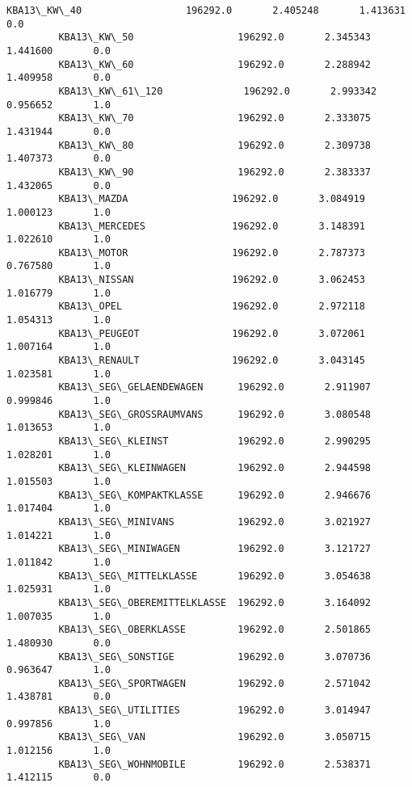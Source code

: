 \documentclass[11pt]{article}
\begin{document}
\begin{Verbatim}[commandchars=\\\{\}]
         KBA13\_KW\_40                  196292.0       2.405248       1.413631       0.0   
         KBA13\_KW\_50                  196292.0       2.345343       1.441600       0.0   
         KBA13\_KW\_60                  196292.0       2.288942       1.409958       0.0   
         KBA13\_KW\_61\_120              196292.0       2.993342       0.956652       1.0   
         KBA13\_KW\_70                  196292.0       2.333075       1.431944       0.0   
         KBA13\_KW\_80                  196292.0       2.309738       1.407373       0.0   
         KBA13\_KW\_90                  196292.0       2.383337       1.432065       0.0   
         KBA13\_MAZDA                  196292.0       3.084919       1.000123       1.0   
         KBA13\_MERCEDES               196292.0       3.148391       1.022610       1.0   
         KBA13\_MOTOR                  196292.0       2.787373       0.767580       1.0   
         KBA13\_NISSAN                 196292.0       3.062453       1.016779       1.0   
         KBA13\_OPEL                   196292.0       2.972118       1.054313       1.0   
         KBA13\_PEUGEOT                196292.0       3.072061       1.007164       1.0   
         KBA13\_RENAULT                196292.0       3.043145       1.023581       1.0   
         KBA13\_SEG\_GELAENDEWAGEN      196292.0       2.911907       0.999846       1.0   
         KBA13\_SEG\_GROSSRAUMVANS      196292.0       3.080548       1.013653       1.0   
         KBA13\_SEG\_KLEINST            196292.0       2.990295       1.028201       1.0   
         KBA13\_SEG\_KLEINWAGEN         196292.0       2.944598       1.015503       1.0   
         KBA13\_SEG\_KOMPAKTKLASSE      196292.0       2.946676       1.017404       1.0   
         KBA13\_SEG\_MINIVANS           196292.0       3.021927       1.014221       1.0   
         KBA13\_SEG\_MINIWAGEN          196292.0       3.121727       1.011842       1.0   
         KBA13\_SEG\_MITTELKLASSE       196292.0       3.054638       1.025931       1.0   
         KBA13\_SEG\_OBEREMITTELKLASSE  196292.0       3.164092       1.007035       1.0   
         KBA13\_SEG\_OBERKLASSE         196292.0       2.501865       1.480930       0.0   
         KBA13\_SEG\_SONSTIGE           196292.0       3.070736       0.963647       1.0   
         KBA13\_SEG\_SPORTWAGEN         196292.0       2.571042       1.438781       0.0   
         KBA13\_SEG\_UTILITIES          196292.0       3.014947       0.997856       1.0   
         KBA13\_SEG\_VAN                196292.0       3.050715       1.012156       1.0   
         KBA13\_SEG\_WOHNMOBILE         196292.0       2.538371       1.412115       0.0   

\end{Verbatim}
\end{document}
